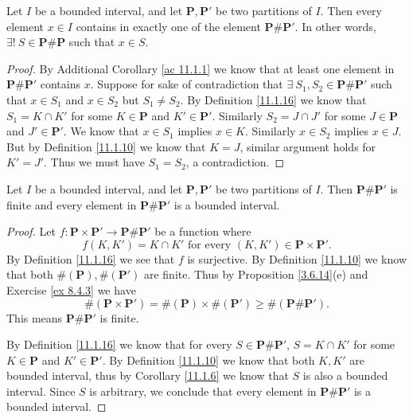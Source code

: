 \begin{additional corollary}\label{ac 11.1.2}
Let \(I\) be a bounded interval, and let \(\mathbf{P}, \mathbf{P}'\) be two partitions of \(I\).
Then every element \(x \in I\) contains in exactly one of the element \(\mathbf{P} \# \mathbf{P}'\).
In other words, \(\exists!\ S \in \mathbf{P} \# \mathbf{P}\) such that \(x \in S\).
\end{additional corollary}

\begin{proof}
    By Additional Corollary \ref{ac 11.1.1} we know that at least one element in \(\mathbf{P} \# \mathbf{P}'\) contains \(x\).
    Suppose for sake of contradiction that \(\exists\ S_1, S_2 \in \mathbf{P} \# \mathbf{P}'\) such that \(x \in S_1\) and \(x \in S_2\) but \(S_1 \neq S_2\).
    By Definition \ref{11.1.16} we know that \(S_1 = K \cap K'\) for some \(K \in \mathbf{P}\) and \(K' \in \mathbf{P}'\).
    Similarly \(S_2 = J \cap J'\) for some \(J \in \mathbf{P}\) and \(J' \in \mathbf{P}'\).
    We know that \(x \in S_1\) implies \(x \in K\).
    Similarly \(x \in S_2\) implies \(x \in J\).
    But by Definition \ref{11.1.10} we know that \(K = J\), similar argument holds for \(K' = J'\).
    Thus we must have \(S_1 = S_2\), a contradiction.
\end{proof}

\begin{additional corollary}\label{ac 11.1.3}
Let \(I\) be a bounded interval, and let \(\mathbf{P}, \mathbf{P}'\) be two partitions of \(I\).
Then \(\mathbf{P} \# \mathbf{P}'\) is finite and every element in \(\mathbf{P} \# \mathbf{P}'\) is a bounded interval.
\end{additional corollary}

\begin{proof}
    Let \(f : \mathbf{P} \times \mathbf{P}' \to \mathbf{P} \# \mathbf{P}'\) be a function where
    \[
        f(K, K') = K \cap K' \text{ for every } (K, K') \in \mathbf{P} \times \mathbf{P}'.
    \]
    By Definition \ref{11.1.16} we see that \(f\) is surjective.
    By Definition \ref{11.1.10} we know that both \(\#(\mathbf{P}), \#(\mathbf{P}')\) are finite.
    Thus by Proposition \ref{3.6.14}(e) and Exercise \ref{ex 8.4.3} we have
    \[
        \#(\mathbf{P} \times \mathbf{P}') = \#(\mathbf{P}) \times \#(\mathbf{P}') \geq \#(\mathbf{P} \# \mathbf{P}').
    \]
    This means \(\mathbf{P} \# \mathbf{P}'\) is finite.

    By Definition \ref{11.1.16} we know that for every \(S \in \mathbf{P} \# \mathbf{P}'\), \(S = K \cap K'\) for some \(K \in \mathbf{P}\) and \(K' \in \mathbf{P}'\).
    By Definition \ref{11.1.10} we know that both \(K, K'\) are bounded interval, thus by Corollary \ref{11.1.6} we know that \(S\) is also a bounded interval.
    Since \(S\) is arbitrary, we conclude that every element in \(\mathbf{P} \# \mathbf{P}'\) is a bounded interval.
\end{proof}

